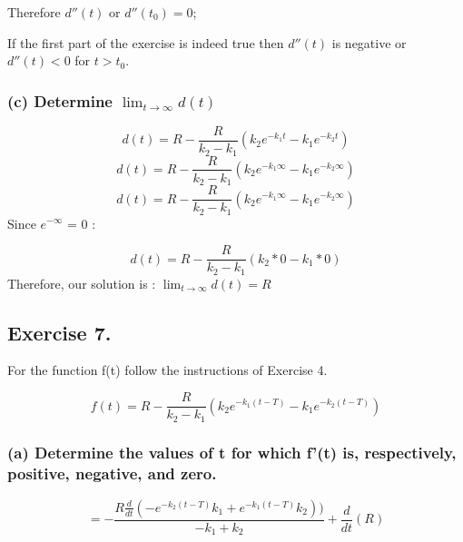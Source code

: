 \documentclass[]{article}
\begin{document}
Therefore \(d''(t)\) or \(d''(t_0) =0\);

If the first part of the exercise is indeed true then \(d''(t)\) is
negative or \(d''(t) < 0\) for \(t > t_0\).

\subsubsection{\texorpdfstring{(c) Determine
\(\lim_{t\to\infty}d(t)\)}{(c) Determine \textbackslash{}lim\_\{t\textbackslash{}to\textbackslash{}infty\}d(t)}}\label{c-determine-lim_ttoinftydt}

\[d(t) = R - \frac{R}{k_2 - k_1}(k_2 e ^{-k_1 t} - k_1 e^{-k_2 t})\]
\[d(t) = R - \frac{R}{k_2 - k_1}(k_2 e ^{-k_1 \infty} - k_1 e^{-k_2 \infty})\]
\[d(t) = R - \frac{R}{k_2 - k_1}(k_2 e ^{-k_1 \infty} - k_1 e^{-k_2 \infty})\]
Since \(e^{-\infty}\) = 0 :

\[d(t) = R - \frac{R}{k_2 - k_1}(k_2*0 - k_1*0)\] Therefore, our
solution is : \(\lim_{t\to\infty}d(t) =R\)

\subsection{Exercise 7.}\label{exercise-7.}

For the function f(t) follow the instructions of Exercise 4.

\[f(t) = R - \frac{R}{k_2 - k_1}(k_2 e^{-k_1(t-T)}-k_1 e^{-k_2(t-T)})\]

\subsubsection{(a) Determine the values of t for which f'(t) is,
respectively, positive, negative, and
zero.}\label{a-determine-the-values-of-t-for-which-ft-is-respectively-positive-negative-and-zero.}

\[=- \frac{R \frac{d}{dt}(-e^{-k_2 (t-T)}k_1 + e^{-k_1(t - T)}k_2))}{-k_1 + k_2} + \frac{d}{dt}(R)\]
\end{document}
